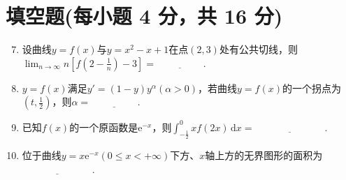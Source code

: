 \documentclass[../main.tex]{subfiles}
\begin{document}
\section{填空题(每小题 4 分，共 16 分)}
\begin{enumerate}
    \setcounter{enumi}{6}
    \item 设曲线$y=f(x)$与$y=x^{2}-x+1$在点$(2,3)$处有公共切线，则$\lim_{n\to\infty}
              n\left[f\left(2-\frac{1}{n}\right)-3\right]=\underline{\hspace{2cm}}$.
          \vspace{0.5em}

    \item $y=f(x)$满足$y'=(1-y)y^{\alpha}(\alpha>0)$，若曲线$y=f(x)$的一个拐点为$\left
              (t,\frac{1}{2}\right)$，则$\alpha=\underline{\hspace{2cm}}$.
          \vspace{0.5em}

    \item 已知$f(x)$的一个原函数是$\mathrm{e}^{-x}$，则$\int_{-\frac{1}{2}}^{0}
              xf(2x)\,\mathrm{d}x=\underline{\hspace{3cm}}$.
          \vspace{0.5em}

    \item 位于曲线$y=x\mathrm{e}^{-x}(0\leq x<+\infty)$下方、$x$轴上方的无界图形的面积为$\underline
              {\hspace{3cm}}$.
          \vspace{0.5em}
\end{enumerate}
\end{document}
